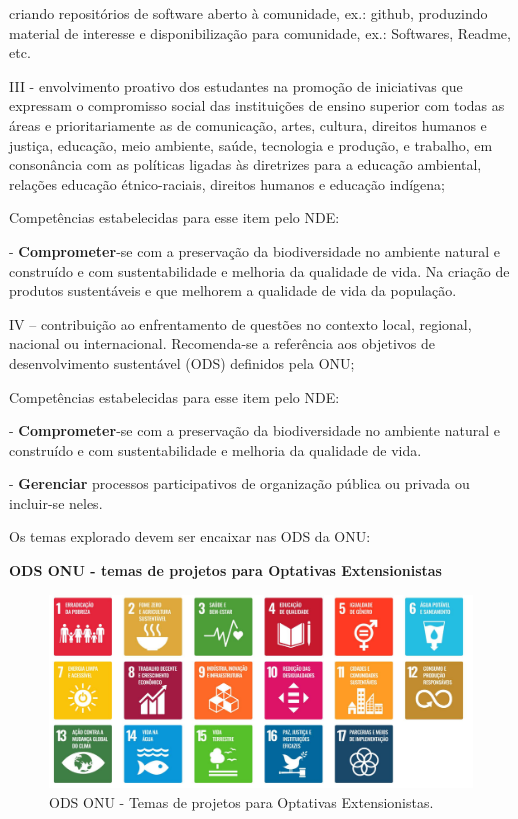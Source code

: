 criando repositórios de software aberto à comunidade, ex.: github, produzindo material de interesse e disponibilização
para comunidade, ex.: Softwares, Readme, etc. 


\bigskip

III - envolvimento proativo dos estudantes na promoção de iniciativas que expressam o compromisso social das
instituições de ensino superior com todas as áreas e prioritariamente as de comunicação, artes, cultura, direitos
humanos e justiça, educação, meio ambiente, saúde, tecnologia e produção, e trabalho, em consonância com as políticas
ligadas às diretrizes para a educação ambiental, relações educação étnico-raciais, direitos humanos e educação
indígena; 

Competências estabelecidas para esse item pelo NDE:

{}- \textbf{Comprometer}{}-se com a preservação da biodiversidade no ambiente natural e construído e com
sustentabilidade e melhoria da qualidade de vida. Na criação de produtos sustentáveis e que melhorem a qualidade de
vida da população.


\bigskip

IV – contribuição ao enfrentamento de questões no contexto local, regional, nacional ou internacional. Recomenda-se a
referência aos objetivos de desenvolvimento sustentável (ODS) definidos pela ONU; 

Competências estabelecidas para esse item pelo NDE:

{}- \textbf{Comprometer}{}-se com a preservação da biodiversidade no ambiente natural e construído e com
sustentabilidade e melhoria da qualidade de vida.

{}- \textbf{Gerenciar }processos participativos de organização pública ou privada ou incluir-se neles.

Os temas explorado devem ser encaixar nas ODS da ONU:

\textbf{ODS ONU - temas de projetos para Optativas Extensionistas}



\begin{figure}[H]
    \centering
    \caption{ODS ONU - Temas de projetos para Optativas Extensionistas.}
    \label{fig:ODS}
    \includegraphics[width=\textwidth]{enc/imagens/ODS-ONU.pdf}
\end{figure}



